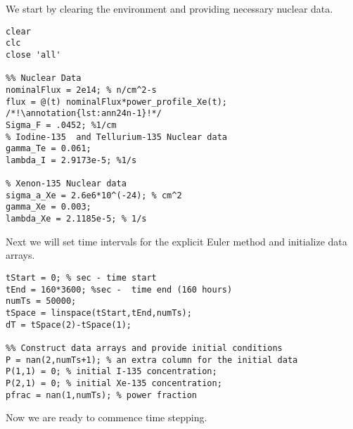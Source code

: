 \noindent We start by clearing the environment and providing necessary nuclear data. 
\begin{lstlisting}[style=myMatlab,name=lec24n-ex1]
clear
clc
close 'all'

%% Nuclear Data
nominalFlux = 2e14; % n/cm^2-s  
flux = @(t) nominalFlux*power_profile_Xe(t); /*!\annotation{lst:ann24n-1}!*/
Sigma_F = .0452; %1/cm 
% Iodine-135  and Tellurium-135 Nuclear data
gamma_Te = 0.061; 
lambda_I = 2.9173e-5; %1/s

% Xenon-135 Nuclear data
sigma_a_Xe = 2.6e6*10^(-24); % cm^2
gamma_Xe = 0.003; 
lambda_Xe = 2.1185e-5; % 1/s 
\end{lstlisting}
\noindent Next we will set time intervals for the explicit Euler method and initialize data arrays.
\begin{lstlisting}[style=myMatlab,name=lec24n-ex1]
%% Time discretization
tStart = 0; % sec - time start
tEnd = 160*3600; %sec -  time end (160 hours)
numTs = 50000; 
tSpace = linspace(tStart,tEnd,numTs);
dT = tSpace(2)-tSpace(1);

%% Construct data arrays and provide initial conditions
P = nan(2,numTs+1); % an extra column for the initial data
P(1,1) = 0; % initial I-135 concentration;
P(2,1) = 0; % initial Xe-135 concentration;
pfrac = nan(1,numTs); % power fraction

\end{lstlisting}
\noindent Now we are ready to commence time stepping.
